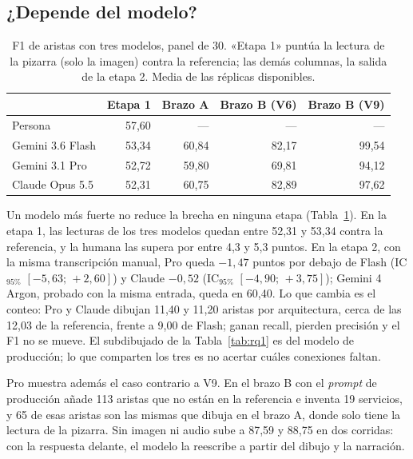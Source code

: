 \documentclass[a4paper, twocolumn, 10pt]{IEEEtran}
\begin{document}
\subsection{¿Depende del modelo?}
\label{sec:modelos}

\begin{table}[H]
\centering\footnotesize\setlength{\tabcolsep}{3pt}
\caption{F1 de aristas con tres modelos, panel de 30. «Etapa 1» puntúa la lectura
de la pizarra (solo la imagen) contra la referencia; las demás columnas, la salida
de la etapa 2. Media de las réplicas disponibles.}
\label{tab:modelos}
\begin{tabular}{lrrrr}
\toprule
 & Etapa 1 & Brazo A & Brazo B (V6) & Brazo B (V9)\\
\midrule
Persona                & 57,60 & ---   & ---   & ---\\
Gemini 3.6 Flash       & 53,34 & 60,84 & 82,17 & 99,54\\
Gemini 3.1 Pro         & 52,72 & 59,80 & 69,81 & 94,12\\
Claude Opus 5.5        & 52,31 & 60,75 & 82,89 & 97,62\\
\bottomrule
\end{tabular}
\end{table}

Un modelo más fuerte no reduce la brecha en ninguna etapa (Tabla~\ref{tab:modelos}).
En la etapa 1, las lecturas de los tres modelos quedan entre 52,31 y 53,34 contra la
referencia, y la humana las supera por entre 4,3 y 5,3 puntos. En la etapa 2, con la
misma transcripción manual, Pro queda $-1{,}47$ puntos por debajo de Flash
(IC$_{95\%}$ $[-5{,}63;\,+2{,}60]$) y Claude $-0{,}52$ (IC$_{95\%}$
$[-4{,}90;\,+3{,}75]$); Gemini 4 Argon, probado con la misma entrada, queda en 60,40.
Lo que cambia es el conteo: Pro y Claude dibujan 11,40 y
11,20 aristas por arquitectura, cerca de las 12,03 de la referencia, frente a 9,00
de Flash; ganan recall, pierden precisión y el F1 no se mueve. El subdibujado de la
Tabla~\ref{tab:rq1} es del modelo de producción; lo que comparten los tres es no
acertar cuáles conexiones faltan.

Pro muestra además el caso contrario a V9. En el brazo B con el \emph{prompt} de
producción añade 113 aristas que no están en la referencia e inventa 19 servicios, y
65 de esas aristas son las mismas que dibuja en el brazo A, donde solo tiene la
lectura de la pizarra. Sin imagen ni audio sube a 87,59 y 88,75 en dos corridas: con
la respuesta delante, el modelo la reescribe a partir del dibujo y la narración.
\end{document}
